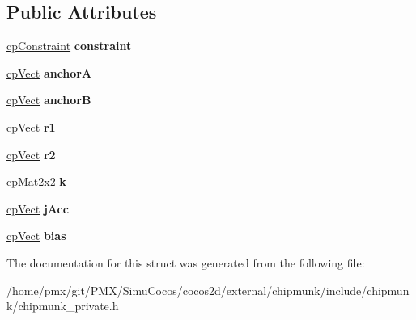 \subsection*{Public Attributes}
\begin{DoxyCompactItemize}
\item 
\mbox{\label{structcpPivotJoint_af1cac6b4862609255538a932e1ef380a}} 
\hyperlink{structcpConstraint}{cp\+Constraint} {\bfseries constraint}
\item 
\mbox{\label{structcpPivotJoint_af2cdd0e3055287b4d416a4dabc732406}} 
\hyperlink{structcpVect}{cp\+Vect} {\bfseries anchorA}
\item 
\mbox{\label{structcpPivotJoint_a27c40ef45bffe971b3b80a7a5ed157c8}} 
\hyperlink{structcpVect}{cp\+Vect} {\bfseries anchorB}
\item 
\mbox{\label{structcpPivotJoint_aa79b763321f06525109ab43363fd6c61}} 
\hyperlink{structcpVect}{cp\+Vect} {\bfseries r1}
\item 
\mbox{\label{structcpPivotJoint_af50465e6c92e3c6b155698c80dcd24fd}} 
\hyperlink{structcpVect}{cp\+Vect} {\bfseries r2}
\item 
\mbox{\label{structcpPivotJoint_a8e1a177d020a33f2b27ca1c5f76aeb4a}} 
\hyperlink{structcpMat2x2}{cp\+Mat2x2} {\bfseries k}
\item 
\mbox{\label{structcpPivotJoint_a5fdaa4d61cf4fff7f2b5486135dec8f0}} 
\hyperlink{structcpVect}{cp\+Vect} {\bfseries j\+Acc}
\item 
\mbox{\label{structcpPivotJoint_acf18bcfb9c42364240853413b6b16b51}} 
\hyperlink{structcpVect}{cp\+Vect} {\bfseries bias}
\end{DoxyCompactItemize}


The documentation for this struct was generated from the following file\+:\begin{DoxyCompactItemize}
\item 
/home/pmx/git/\+P\+M\+X/\+Simu\+Cocos/cocos2d/external/chipmunk/include/chipmunk/chipmunk\+\_\+private.\+h\end{DoxyCompactItemize}
